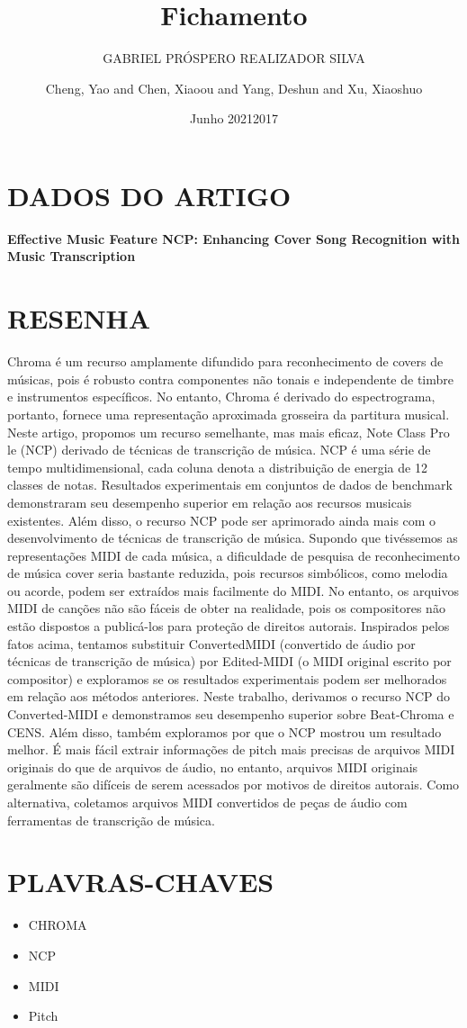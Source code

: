 \documentclass{article}
\title{Fichamento}
\author{GABRIEL PRÓSPERO REALIZADOR  SILVA}
\date{Junho 2021}
\begin{document}
\maketitle

\section{DADOS DO ARTIGO}
\textbf{Effective Music Feature NCP: Enhancing Cover Song Recognition with Music Transcription \\}
\author{Cheng, Yao and Chen, Xiaoou and Yang, Deshun and Xu, Xiaoshuo \\}
\date{2017}

\section{RESENHA}

Chroma é um recurso amplamente difundido para reconhecimento de covers de músicas, pois é robusto contra componentes não tonais e independente de timbre e instrumentos específicos. 
No entanto, Chroma é derivado do espectrograma, portanto, fornece uma representação aproximada grosseira da partitura musical. 
Neste artigo, propomos um recurso semelhante, mas mais eficaz, Note Class Pro le (NCP) derivado de técnicas de transcrição de música. 
NCP é uma série de tempo multidimensional, cada coluna denota a distribuição de energia de 12 classes de notas. 
Resultados experimentais em conjuntos de dados de benchmark demonstraram seu desempenho superior em relação aos recursos musicais existentes. 
Além disso, o recurso NCP pode ser aprimorado ainda mais com o desenvolvimento de técnicas de transcrição de música.
Supondo que tivéssemos as representações MIDI de cada música, a dificuldade de pesquisa de reconhecimento de música cover seria bastante reduzida, pois recursos simbólicos, como melodia ou acorde, podem ser extraídos mais facilmente do MIDI. 
No entanto, os arquivos MIDI de canções não são fáceis de obter na realidade, pois os compositores não estão dispostos a publicá-los para proteção de direitos autorais. 
Inspirados pelos fatos acima, tentamos substituir ConvertedMIDI (convertido de áudio por técnicas de transcrição de música) por Edited-MIDI (o MIDI original escrito por compositor) e exploramos se os resultados experimentais podem ser melhorados em relação aos métodos anteriores. 
Neste trabalho, derivamos o recurso NCP do Converted-MIDI e demonstramos seu desempenho superior sobre Beat-Chroma e CENS. 
Além disso, também exploramos por que o NCP mostrou um resultado melhor.
É mais fácil extrair informações de pitch mais precisas de arquivos MIDI originais do que de arquivos de áudio, no entanto, arquivos MIDI originais geralmente são difíceis de serem acessados por motivos de direitos autorais. 
Como alternativa, coletamos arquivos MIDI convertidos de peças de áudio com ferramentas de transcrição de música.
\section{PLAVRAS-CHAVES}
\begin{itemize}
    \item CHROMA
    \item NCP
    \item MIDI
    \item Pitch
\end{itemize}
\end{document}
